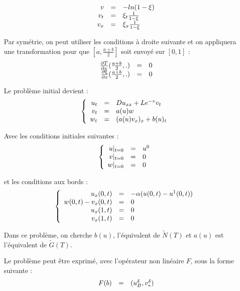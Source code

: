 \documentclass[a4paper,10pt]{article}
\newcommand{\pd}[2]{\frac{\partial #1}{\partial #2}}
\begin{document}
\[
\begin{array}{r c l}
v & = & -ln(1-\xi) \\
v_t & = & \xi_t \frac{1}{1-\xi} \\
v_x & = & \xi_x \frac{1}{1-\xi} \\
\end{array}
\]

Par symétrie, on peut utiliser les conditions à droite suivante et on appliquera une transformation pour que $[a, \frac{a+b}{2}]$ soit envoyé sur $[0,1]$ :
\[
\begin{array}{r c l}
\pd{T}{x}(\frac{a+b}{2}, .) & = & 0 \\
\pd{\xi}{x}(\frac{a+b}{2}, .) & = & 0 \\
\end{array}
\]

Le problème initial devient :
\[
\left\{
\begin{array}{r c l}
u_t		&=&		D u_{xx} + L e^{-v} v_t		\\
v_t		&=&		a(u)w						\\
w_t		&=&		(a(u)v_x)_x + b(u)_t			\\
\end{array}
\right.
\]

Avec les conditions initiales suivantes :
\[
\left\{
\begin{array}{r c l}
u|_{t=0}		&=&		u^0		\\
v|_{t=0}		&=&		0		\\
w|_{t=0}		&=&		0		\\
\end{array}
\right.
\]

et les conditions aux bords :
\[
\left\{
\begin{array}{r c l c}
u_x(0, t)	&=&		-\alpha (u(0,t) - u^1(0, t)) 	\\
w(0, t)		- v_x(0, t)	&=&		0				 	\\
u_x(1,t)		&=&		0								\\
v_x(1,t)		&=&		0								\\
\end{array}
\right.
\]


Dans ce problème, on cherche $b(u)$, l'équivalent de $\widetilde{N}(T)$ et $a(u)$ est l'équivalent de  $\widetilde{G}(T)$.

Le problème peut \^etre exprimé, avec l'opérateur non linéaire $F$, sous la forme suivante :
\[
\begin{array}{r l c}
F(b)		&=&		(u^{\delta}_{B}, v^{\delta}_{*}) \\
\end{array}
\]
\end{document}
